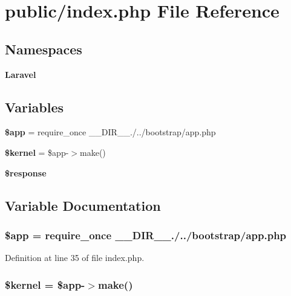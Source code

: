\section{public/index.php File Reference}
\label{index_8php}
\subsection*{Namespaces}
\begin{DoxyCompactItemize}
\item 
 {\bf Laravel}
\end{DoxyCompactItemize}
\subsection*{Variables}
\begin{DoxyCompactItemize}
\item 
{\bf \$app} = require\+\_\+once \+\_\+\+\_\+\+D\+I\+R\+\_\+\+\_\+.\textquotesingle{}/../bootstrap/app.\+php\textquotesingle{}
\item 
{\bf \$kernel} = \$app-\/$>$make(\textquotesingle{})
\item 
{\bf \$response}
\end{DoxyCompactItemize}


\subsection{Variable Documentation}
\subsubsection[{\$app}]{\setlength{\rightskip}{0pt plus 5cm}\$app = require\+\_\+once \+\_\+\+\_\+\+D\+I\+R\+\_\+\+\_\+.\textquotesingle{}/../bootstrap/app.\+php\textquotesingle{}}\label{index_8php_adfb117f244076aa9bc269269f7e57403}


Definition at line 35 of file index.\+php.

\subsubsection[{\$kernel}]{\setlength{\rightskip}{0pt plus 5cm}\$kernel = \$app-\/$>$make(\textquotesingle{})}\label{index_8php_abf40ed7ce84347395deb8abf12cdd9da}


